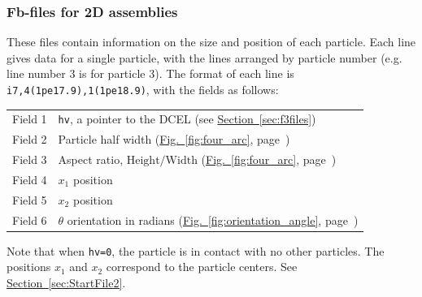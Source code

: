 \documentclass[letterpaper,11pt]{article}
\begin{document}
\subsubsection{Fb-files for 2D assemblies}\label{sec:f2files}
These files contain information on the size and position of each particle.
Each line gives data for a single particle, with the
lines arranged by particle number (e.g. line number 3 is for particle
3).
The format of each line is \texttt{i7,4(1pe17.9),1(1pe18.9)}, 
with the fields as follows:
\begin{center}
\begin{tabular}{lp{3.5in}}
Field 1 & \texttt{hv}, a pointer to the DCEL 
(see \hyperref[sec:f3files]{Section~\ref*{sec:f3files}}) \\
Field 2 & Particle half width
(\hyperref[fig:four_arc]{Fig.~\ref*{fig:four_arc}},
page~\pageref{fig:four_arc})\\
Field 3 & Aspect ratio, $\mathrm{Height}/\mathrm{Width}$ 
(\hyperref[fig:four_arc]{Fig.~\ref*{fig:four_arc}},
page~\pageref{fig:four_arc})\\
Field 4 & $x_{1}$ position \\
Field 5 & $x_{2}$ position \\
Field 6 & $\theta$ orientation in radians 
(\hyperref[fig:orientation_angle]{Fig.~\ref*{fig:orientation_angle}},
page~\pageref{fig:orientation_angle})
\end{tabular}
\end{center}
Note that when \texttt{hv=0}, the particle is in contact with no other
particles.
The positions $x_{1}$ and $x_{2}$ correspond to the particle centers.
See
\hyperref[sec:StartFile2]{Section~\ref*{sec:StartFile2}}.
%
\end{document}
